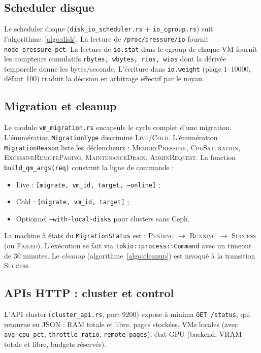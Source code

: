 \subsection{Scheduler disque}

Le scheduler disque (\texttt{disk\_io\_scheduler.rs} + \texttt{io\_cgroup.rs}) suit l'algorithme~\ref{algo:disk}. La lecture de \texttt{/proc/pressure/io} fournit \texttt{node\_pressure\_pct}. La lecture de \texttt{io.stat} dans le cgroup de chaque VM fournit les compteurs cumulatifs \texttt{rbytes, wbytes, rios, wios} dont la dérivée temporelle donne les bytes/seconde. L'écriture dans \texttt{io.weight} (plage 1--10000, défaut 100) traduit la décision en arbitrage effectif par le noyau.

\subsection{Migration et cleanup}

Le module \texttt{vm\_migration.rs} encapsule le cycle complet d'une migration. L'énumération \texttt{MigrationType} discrimine \textsc{Live}/\textsc{Cold}. L'énumération \texttt{MigrationReason} liste les déclencheurs : \textsc{MemoryPressure}, \textsc{CpuSaturation}, \textsc{ExcessiveRemotePaging}, \textsc{MaintenanceDrain}, \textsc{AdminRequest}. La fonction \texttt{build\_qm\_args(req)} construit la ligne de commande :
\begin{itemize}[leftmargin=*]
    \item Live : \texttt{[migrate, vm\_id, target, --online]} ;
    \item Cold : \texttt{[migrate, vm\_id, target]} ;
    \item Optionnel \texttt{--with-local-disks} pour clusters sans Ceph.
\end{itemize}
La machine à états du \texttt{MigrationStatus} est : \textsc{Pending} $\to$ \textsc{Running} $\to$ \textsc{Success} (ou \textsc{Failed}). L'exécution se fait via \texttt{tokio::process::Command} avec un timeout de 30 minutes. Le \emph{cleanup} (algorithme~\ref{algo:cleanup}) est invoqué à la transition \textsc{Success}.

\subsection{APIs HTTP : cluster et control}

L'API cluster (\texttt{cluster\_api.rs}, port 9200) expose à minima \texttt{GET /status}, qui retourne en JSON : RAM totale et libre, pages stockées, VMs locales (avec \texttt{avg\_cpu\_pct}, \texttt{throttle\_ratio}, \texttt{remote\_pages}), état GPU (backend, VRAM totale et libre, budgets réservés).

